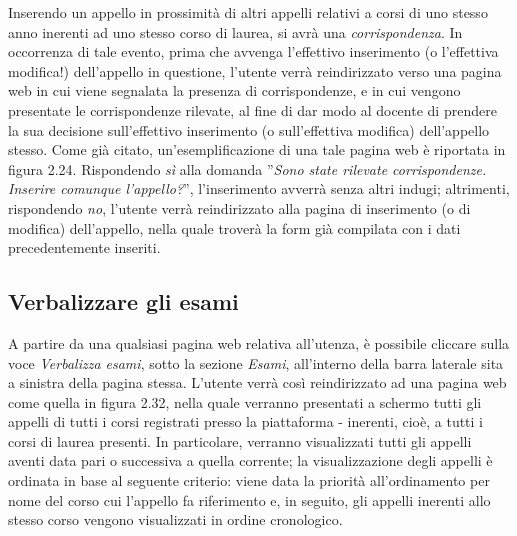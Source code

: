 \documentclass [a4paper,11pt]{book}
\begin{document}
Inserendo un appello in prossimità di altri appelli relativi a corsi di uno stesso anno inerenti ad uno stesso corso di laurea, si avrà una \emph{corrispondenza}. In occorrenza di tale evento, prima che avvenga l'effettivo inserimento (o l'effettiva modifica!) dell'appello in questione, l'utente verrà reindirizzato verso una pagina web in cui viene segnalata la presenza di corrispondenze, e in cui vengono presentate le corrispondenze rilevate, al fine di dar modo al docente di prendere la sua decisione sull'effettivo inserimento (o sull'effettiva modifica) dell'appello stesso. Come già citato, un'esemplificazione di una tale pagina web è riportata in figura 2.24. Rispondendo \emph{sì} alla domanda ''\emph{Sono state rilevate corrispondenze. Inserire comunque l'appello?}'', l'inserimento avverrà senza altri indugi; altrimenti, rispondendo \emph{no}, l'utente verrà reindirizzato alla pagina di inserimento (o di modifica) dell'appello, nella quale troverà la form già compilata con i dati precedentemente inseriti.

\medskip

\subsection{Verbalizzare gli esami}

A partire da una qualsiasi pagina web relativa all'utenza, è possibile cliccare sulla voce \emph{Verbalizza esami}, sotto la sezione \emph{Esami}, all'interno della barra laterale sita a sinistra della pagina stessa. L'utente verrà così reindirizzato ad una pagina web come quella in figura 2.32, nella quale verranno presentati a schermo tutti gli appelli di tutti i corsi registrati presso la piattaforma - inerenti, cioè, a tutti i corsi di laurea presenti. In particolare, verranno visualizzati tutti gli appelli aventi data pari o successiva a quella corrente; la visualizzazione degli appelli è ordinata in base al seguente criterio: viene data la priorità all'ordinamento per nome del corso cui l'appello fa riferimento e, in seguito, gli appelli inerenti allo stesso corso vengono visualizzati in ordine cronologico.
\end{document}
